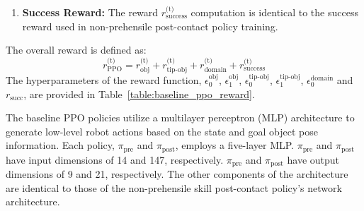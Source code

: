 \begin{itemize}
\begin{enumerate}
    
        \item \textbf{Success Reward:} The reward $r^\text{(t)}_\text{success}$ computation is identical to the success reward used in non-prehensile post-contact policy training.%
    \end{enumerate}

    The overall reward is defined as:
    \[
    r^\text{(t)}_{\text{PPO}} = r^\text{(t)}_{\text{obj}} + r^\text{(t)}_{\text{tip-obj}} + r^\text{(t)}_{\text{domain}} + r^\text{(t)}_{\text{success}}
    \]
    The hyperparameters of the reward function, $\epsilon_0^{\text{obj}}$, $\epsilon_1^{\text{obj}}$, $\epsilon_0^{\text{tip-obj}}$, $\epsilon_1^{\text{tip-obj}}$, $\epsilon_0^{\text{domain}}$ and $r_{\text{succ}}$, are provided in Table~\ref{table:baseline_ppo_reward}.
    
\end{itemize}

The baseline PPO policies utilize a multilayer perceptron (MLP) architecture to generate low-level robot actions based on the state and goal object pose information. Each policy, $\pi_{\text{pre}}$ and $\pi_{\text{post}}$, employs a five-layer MLP. $\pi_{\text{pre}}$ and $\pi_{\text{post}}$ have input dimensions of 14 and 147, respectively. $\pi_{\text{pre}}$ and $\pi_{\text{post}}$ have output dimensions of 9 and 21, respectively. The other components of the architecture are identical to those of the non-prehensile skill post-contact policy's network architecture.


